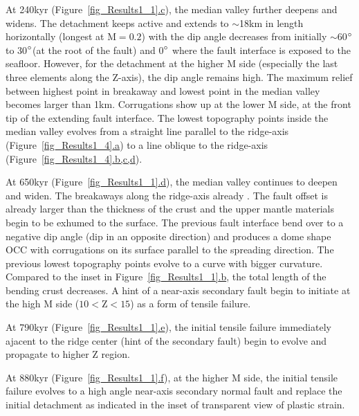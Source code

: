 At 240kyr (Figure~\hyperref[fig_Results1_1]{\ref{fig_Results1_1}.c}), the median valley further deepens and widens. The detachment keeps active and extends to $\sim$18km in length horizontally (longest at M$=0.2$) with the dip angle decreases from initially $\sim$60$\degree$ to 30$\degree$(at the root of the fault) and 0$\degree$ where the fault interface is exposed to the seafloor. However, for the detachment at the higher M side (especially the last three elements along the Z-axis), the dip angle remains high. The maximum relief between highest point in breakaway and lowest point in the median valley becomes larger than 1km. Corrugations show up at the lower M side, at the front tip of the extending fault interface. The lowest topography points inside the median valley evolves from a straight line parallel to the ridge-axis (Figure~\hyperref[fig_Results1_4]{\ref{fig_Results1_4}.a}) to a line oblique to the ridge-axis (Figure~\hyperref[fig_Results1_4]{\ref{fig_Results1_4}.b,c,d}). 

At 650kyr (Figure~\hyperref[fig_Results1_1]{\ref{fig_Results1_1}.d}), the median valley continues to deepen and widen. The breakaways along the ridge-axis already . The fault offset is already larger than the thickness of the crust and the upper mantle materials begin to be exhumed to the surface. The previous fault interface bend over to a negative dip angle (dip in an opposite direction) and produces a dome shape OCC with corrugations on its surface parallel to the spreading direction. The previous lowest topography points evolve to a curve with bigger curvature. Compared to the inset in Figure~\hyperref[fig_Results1_1]{\ref{fig_Results1_1}.b}, the total length of the bending crust decreases. A hint of a near-axis secondary fault begin to initiate at the high M side ($10<$Z$<15$) as a form of tensile failure. 

At 790kyr (Figure~\hyperref[fig_Results1_1]{\ref{fig_Results1_1}.e}), the initial tensile failure immediately ajacent to the ridge center (hint of the secondary fault) begin to evolve and propagate to higher Z region.  

At 880kyr (Figure~\hyperref[fig_Results1_1]{\ref{fig_Results1_1}.f}), at the higher M side, the initial tensile failure evolves to a high angle near-axis secondary normal fault and replace the initial detachment as indicated in the inset of transparent view of plastic strain.

